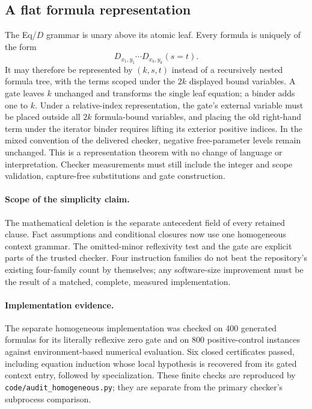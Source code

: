 \documentclass[11pt]{article}
\theoremstyle{definition}\newtheorem{definition}[theorem]{Definition}
\theoremstyle{remark}\newtheorem{remark}[theorem]{Remark}
\begin{document}
\subsection{A flat formula representation}

The Eq/$D$ grammar is unary above its atomic leaf.  Every formula is
uniquely of the form
\[
 D_{x_1,y_1}\cdots D_{x_k,y_k}(s=t).
\]
It may therefore be represented by $(k,s,t)$ instead of a recursively
nested formula tree, with the terms scoped under the $2k$ displayed
bound variables.  A gate leaves $k$ unchanged and transforms the single
leaf equation; a binder adds one to $k$.  Under a relative-index
representation, the gate's external variable must be placed outside all
$2k$ formula-bound variables, and placing the old right-hand term under the iterator binder
requires lifting its exterior positive indices. In the mixed convention
of the delivered checker, negative free-parameter levels remain unchanged.  This is a representation theorem with no change
of language or interpretation.  Checker measurements must still include
the integer and scope validation, capture-free substitutions and gate
construction.

\paragraph{Scope of the simplicity claim.}
The mathematical deletion is the separate antecedent field of every
retained clause.  Fact assumptions and conditional closures now use one
homogeneous context grammar.  The omitted-minor reflexivity test and the
gate are explicit parts of the trusted checker.  Four instruction
families do not beat the repository's existing four-family count by
themselves; any software-size improvement must be the result of a
matched, complete, measured implementation.


\paragraph{Implementation evidence.}
The separate homogeneous implementation was checked on 400 generated
formulas for its literally reflexive zero gate and on 800 positive-control
instances against environment-based numerical evaluation. Six closed
certificates passed, including equation induction whose local hypothesis
is recovered from its gated context entry, followed by specialization.
These finite checks are reproduced by \texttt{code/audit\_homogeneous.py};
they are separate from the primary checker's subprocess comparison.
\end{document}
